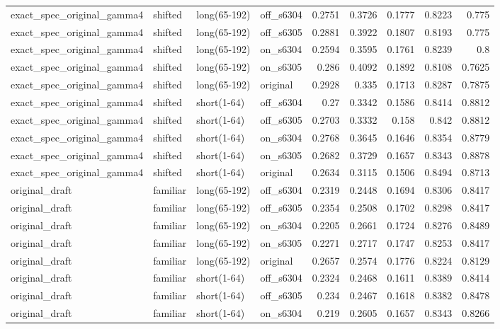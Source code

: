 \begin{table}
\begin{tabular}{llllrrrrr}
exact\_spec\_original\_gamma4 & shifted & long(65-192) & off\_s6304 & 0.2751 & 0.3726 & 0.1777 & 0.8223 & 0.775 \\
exact\_spec\_original\_gamma4 & shifted & long(65-192) & off\_s6305 & 0.2881 & 0.3922 & 0.1807 & 0.8193 & 0.775 \\
exact\_spec\_original\_gamma4 & shifted & long(65-192) & on\_s6304 & 0.2594 & 0.3595 & 0.1761 & 0.8239 & 0.8 \\
exact\_spec\_original\_gamma4 & shifted & long(65-192) & on\_s6305 & 0.286 & 0.4092 & 0.1892 & 0.8108 & 0.7625 \\
exact\_spec\_original\_gamma4 & shifted & long(65-192) & original & 0.2928 & 0.335 & 0.1713 & 0.8287 & 0.7875 \\
exact\_spec\_original\_gamma4 & shifted & short(1-64) & off\_s6304 & 0.27 & 0.3342 & 0.1586 & 0.8414 & 0.8812 \\
exact\_spec\_original\_gamma4 & shifted & short(1-64) & off\_s6305 & 0.2703 & 0.3332 & 0.158 & 0.842 & 0.8812 \\
exact\_spec\_original\_gamma4 & shifted & short(1-64) & on\_s6304 & 0.2768 & 0.3645 & 0.1646 & 0.8354 & 0.8779 \\
exact\_spec\_original\_gamma4 & shifted & short(1-64) & on\_s6305 & 0.2682 & 0.3729 & 0.1657 & 0.8343 & 0.8878 \\
exact\_spec\_original\_gamma4 & shifted & short(1-64) & original & 0.2634 & 0.3115 & 0.1506 & 0.8494 & 0.8713 \\
original\_draft & familiar & long(65-192) & off\_s6304 & 0.2319 & 0.2448 & 0.1694 & 0.8306 & 0.8417 \\
original\_draft & familiar & long(65-192) & off\_s6305 & 0.2354 & 0.2508 & 0.1702 & 0.8298 & 0.8417 \\
original\_draft & familiar & long(65-192) & on\_s6304 & 0.2205 & 0.2661 & 0.1724 & 0.8276 & 0.8489 \\
original\_draft & familiar & long(65-192) & on\_s6305 & 0.2271 & 0.2717 & 0.1747 & 0.8253 & 0.8417 \\
original\_draft & familiar & long(65-192) & original & 0.2657 & 0.2574 & 0.1776 & 0.8224 & 0.8129 \\
original\_draft & familiar & short(1-64) & off\_s6304 & 0.2324 & 0.2468 & 0.1611 & 0.8389 & 0.8414 \\
original\_draft & familiar & short(1-64) & off\_s6305 & 0.234 & 0.2467 & 0.1618 & 0.8382 & 0.8478 \\
original\_draft & familiar & short(1-64) & on\_s6304 & 0.219 & 0.2605 & 0.1657 & 0.8343 & 0.8266 \\

\end{tabular}
\end{table}
